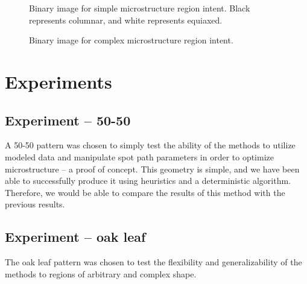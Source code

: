 \documentclass[a4paper]{article}
\begin{document}
\begin{figure}
\centering
{}
\caption{\label{fig:intent50}Binary image for simple microstructure region intent. Black represents columnar, and white represents equiaxed.}
\end{figure}

\begin{figure}
\centering
{}
\caption{\label{fig:intentleaf}Binary image for complex microstructure region intent.}
\end{figure}



\section{Experiments}
\label{sec:experiments}

\subsection{Experiment – 50-50}
\label{subsec:exp50-50}

A 50-50 pattern was chosen to simply test the ability of the methods to utilize modeled data and manipulate spot path parameters in order to optimize microstructure – a proof of concept. This geometry is simple, and we have been able to successfully produce it using heuristics and a deterministic algorithm. Therefore, we would be able to compare the results of this method with the previous results. 


\subsection{Experiment – oak leaf}
\label{subsec:expleaf}

The oak leaf pattern was chosen to test the flexibility and generalizability of the methods to regions of arbitrary and complex shape. 
\end{document}
